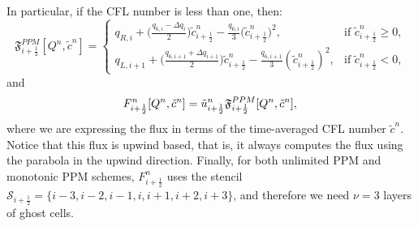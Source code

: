 In particular, if the CFL number is less than one, then:
\begin{equation}
	\label{chp-sec-flux:numerical-flux4}
        \mathfrak{F}_{i+\frac{1}{2}}^{PPM}[Q^n,\tilde{c}^n]  =  
    	\begin{cases}
        q_{R,i} +
        \big(\frac{{q_{6,i} - \Delta q_i}}{2}\big){\tilde{c}_{{i+\frac{1}{2}}}^n}
	- \frac{q_{6,i}}{3}{(\tilde{c}_{{i+\frac{1}{2}}}^n})^2, 
	& \text{if } \tilde{c}_{i+\frac{1}{2}}^n \geq 0,\\
	q_{L,i+1} +
	\big(\frac{q_{6,i+1} + \Delta q_{i+1}}{2}\big){\tilde{c}_{{i+\frac{1}{2}}}^n}
	-\frac{q_{6,i+1}}{3}({\tilde{c}_{{i+\frac{1}{2}}}^n})^2,
	& \text{if } \tilde{c}_{i+\frac{1}{2}}^n<0,
    	\end{cases}
\end{equation}
and
\begin{equation}
	\label{chp-sec-flux:numerical-flux5}
         {F}_{i+\frac{1}{2}}^{n}[Q^n,\tilde{c}^n] = 
         {\tilde{u}}_{i+\frac{1}{2}}^n\mathfrak{F}_{i+\frac{1}{2}}^{PPM}[Q^n,\tilde{c}^n],\\
\end{equation}
where we are expressing the flux in terms of the time-averaged CFL number $\tilde{c}^n$.
Notice that this flux is upwind based, that is, it always computes the flux using the parabola in the upwind direction.
Finally, for both unlimited PPM and monotonic PPM schemes, $F_{i+\frac{1}{2}}^n$ uses the stencil
$\mathcal{S}_{i+\frac{1}{2}} = \{i-3,i-2,i-1,i,i+1,i+2,i+3\}$, and therefore we need $\nu=3$ layers of ghost cells.

